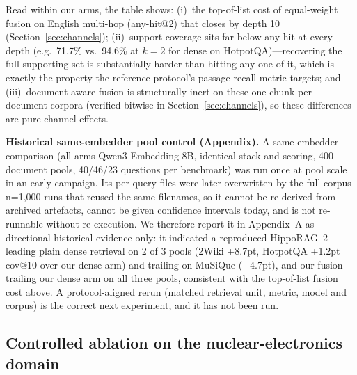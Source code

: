 \documentclass[sigconf,nonacm]{acmart}
\begin{document}
Read within our arms, the table shows: (i)~the top-of-list cost of
equal-weight fusion on English multi-hop (any-hit@2) that closes by
depth 10 (Section~\ref{sec:channels}); (ii)~support coverage sits far
below any-hit at every depth (e.g.\ 71.7\% vs.\ 94.6\% at $k{=}2$ for
dense on HotpotQA)---recovering the full supporting set is
substantially harder than hitting any one of it, which is exactly the
property the reference protocol's passage-recall metric targets; and
(iii)~document-aware fusion is structurally inert on these one-chunk-per-document
corpora (verified bitwise in Section~\ref{sec:channels}), so these
differences are pure channel effects.

\textbf{Historical same-embedder pool control (Appendix).} A
same-embedder comparison (all arms Qwen3-Embedding-8B, identical stack
and scoring, 400-document pools, 40/46/23 questions per benchmark) was
run once at pool scale in an early campaign. Its per-query files were
later overwritten by the full-corpus n=1{,}000 runs that reused the
same filenames, so it cannot be re-derived from archived artefacts,
cannot be given confidence intervals today, and is not re-runnable
without re-execution. We therefore report it in Appendix~A as
directional historical evidence only: it indicated a reproduced
HippoRAG~2 leading plain dense retrieval on 2 of 3 pools (2Wiki
+8.7pt, HotpotQA +1.2pt cov@10 over our dense arm) and trailing on
MuSiQue ($-$4.7pt), and our fusion trailing our dense arm on all three
pools, consistent with the top-of-list fusion cost above. A
protocol-aligned rerun (matched retrieval unit, metric, model and
corpus) is the correct next experiment, and it has not been run.

\subsection{Controlled ablation on the nuclear-electronics domain}
\end{document}

